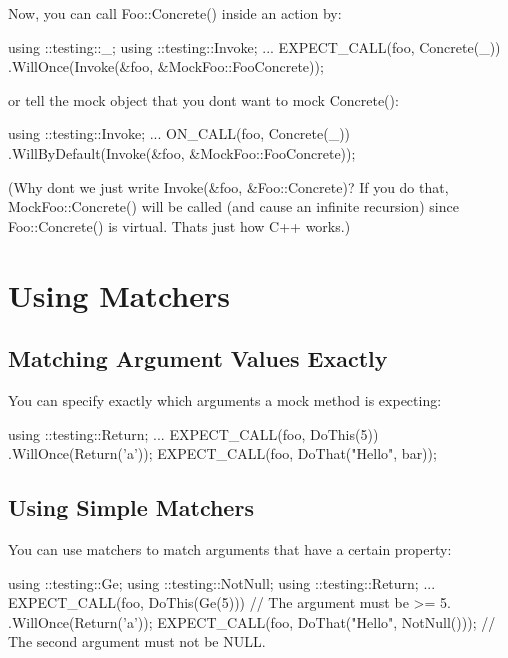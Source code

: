 Now, you can call {\ttfamily Foo\+::\+Concrete()} inside an action by\+:


\begin{DoxyCode}
using ::testing::\_;
using ::testing::Invoke;
...
  EXPECT\_CALL(foo, Concrete(\_))
      .WillOnce(Invoke(&foo, &MockFoo::FooConcrete));
\end{DoxyCode}


or tell the mock object that you don\textquotesingle{}t want to mock {\ttfamily Concrete()}\+:


\begin{DoxyCode}
using ::testing::Invoke;
...
  ON\_CALL(foo, Concrete(\_))
      .WillByDefault(Invoke(&foo, &MockFoo::FooConcrete));
\end{DoxyCode}


(Why don\textquotesingle{}t we just write {\ttfamily Invoke(\&foo, \&\+Foo\+::\+Concrete)}? If you do that, {\ttfamily Mock\+Foo\+::\+Concrete()} will be called (and cause an infinite recursion) since {\ttfamily Foo\+::\+Concrete()} is virtual. That\textquotesingle{}s just how C++ works.)

\section*{Using Matchers}

\subsection*{Matching Argument Values Exactly}

You can specify exactly which arguments a mock method is expecting\+:


\begin{DoxyCode}
using ::testing::Return;
...
  EXPECT\_CALL(foo, DoThis(5))
      .WillOnce(Return(\textcolor{charliteral}{'a'}));
  EXPECT\_CALL(foo, DoThat(\textcolor{stringliteral}{"Hello"}, bar));
\end{DoxyCode}


\subsection*{Using Simple Matchers}

You can use matchers to match arguments that have a certain property\+:


\begin{DoxyCode}
using ::testing::Ge;
using ::testing::NotNull;
using ::testing::Return;
...
  EXPECT\_CALL(foo, DoThis(Ge(5)))  \textcolor{comment}{// The argument must be >= 5.}
      .WillOnce(Return(\textcolor{charliteral}{'a'}));
  EXPECT\_CALL(foo, DoThat(\textcolor{stringliteral}{"Hello"}, NotNull()));
  \textcolor{comment}{// The second argument must not be NULL.}
\end{DoxyCode}


